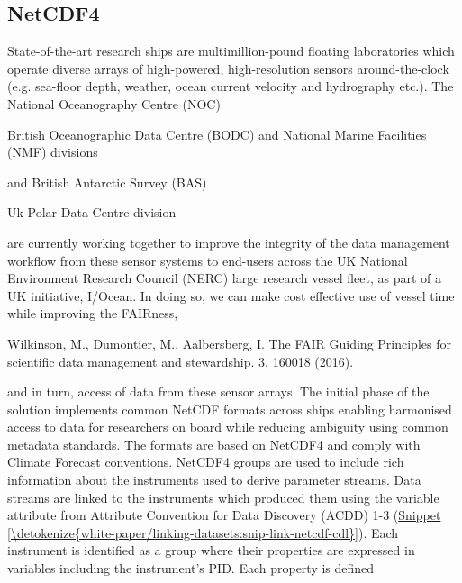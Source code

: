 \documentclass[a4paper,10pt,english]{sphinxmanual}
\begin{document}
\subsection{NetCDF4}
\label{\detokenize{white-paper/linking-datasets:netcdf4}}\label{\detokenize{white-paper/linking-datasets:section-1}}
State-of-the-art research ships are multimillion-pound floating
laboratories which operate diverse arrays of high-powered,
high-resolution sensors around-the-clock (e.g. sea-floor depth, weather,
ocean current velocity and hydrography etc.). The National Oceanography
Centre (NOC)%
\begin{footnote}[1]\sphinxAtStartFootnote
British Oceanographic Data Centre (BODC) and National Marine
Facilities (NMF) divisions
%
\end{footnote} and British Antarctic Survey (BAS)%
\begin{footnote}[2]\sphinxAtStartFootnote
Uk Polar Data Centre division
%
\end{footnote}
are currently working together to improve the integrity of the data
management workflow from these sensor systems to end-users across the UK
National Environment Research Council (NERC) large research vessel
fleet, as part of a UK initiative, I/Ocean. In doing so, we can make
cost effective use of vessel time while improving the
FAIRness,%
\begin{footnote}[3]\sphinxAtStartFootnote
Wilkinson, M., Dumontier, M., Aalbersberg, I.  The FAIR
Guiding Principles for scientific data management and stewardship.
 3, 160018 (2016). 
%
\end{footnote} and in turn, access of data from these
sensor arrays. The initial phase of the solution implements common
NetCDF formats across ships enabling harmonised access to data for
researchers on board while reducing ambiguity using common metadata
standards. The formats are based on NetCDF4 and comply with Climate
Forecast conventions. NetCDF4 groups are used to include rich
information about the instruments used to derive parameter streams. Data
streams are linked to the instruments which produced them using the
variable attribute  from Attribute Convention for Data
Discovery (ACDD) 1-3 (\hyperref[\detokenize{white-paper/linking-datasets:snip-link-netcdf-cdl}]{Snippet \ref{\detokenize{white-paper/linking-datasets:snip-link-netcdf-cdl}}}). Each instrument
is identified as a group where their properties are expressed in
variables including the instrument’s PID. Each property is defined
\end{document}

